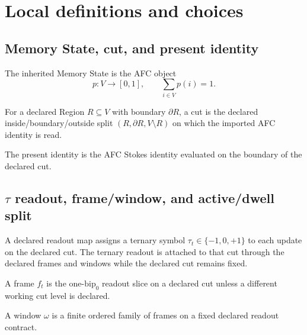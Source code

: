 \section{Local definitions and choices}

\subsection{Memory State, cut, and present identity}
\begin{definition}
\label{def:memory-state}
The inherited Memory State is the AFC object
\[
p:V\to[0,1], \qquad \sum_{i\in V} p(i)=1.
\]
\end{definition}

\begin{definition}[Cut]
\label{def:active-cut}
For a declared Region $R\subseteq V$ with boundary $\partial R$, a cut is the declared inside/boundary/outside split $(R,\partial R,V\setminus R)$ on which the imported AFC identity is read.
\end{definition}

\begin{definition}
\label{def:present-identity}
The present identity is the AFC Stokes identity evaluated on the boundary of the declared cut.
\end{definition}

\subsection{\texorpdfstring{$\tau$}{tau} readout, frame/window, and active/dwell split}
\begin{choice}
\label{choice:tau-readout}
A declared readout map assigns a ternary symbol $\tau_t\in\{-1,0,+1\}$ to each update on the declared cut. The ternary readout is attached to that cut through the declared frames and windows while the declared cut remains fixed.
\end{choice}

\begin{definition}[Frame]
\label{def:frame}
A frame $f_t$ is the one-\(\mathrm{bip}_0\) readout slice on a declared cut unless a different working cut level is declared.
\end{definition}

\begin{definition}[Window]
\label{def:window}
A window $\omega$ is a finite ordered family of frames on a fixed declared readout contract.
\end{definition}

